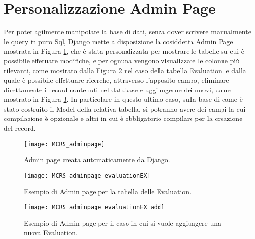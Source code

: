 \section*{Personalizzazione Admin Page}
Per poter agilmente manipolare la base di dati, senza dover scrivere manualmente le query in puro Sql, Django mette a disposizione 
la cosiddetta Admin Page mostrata in Figura \ref{fig:MCRS_adminpage}, che è stata personalizzata per mostrare le tabelle su cui è possibile 
effetuare modifiche, e per ognuna vengono visualizzate le colonne più rilevanti, come mostrato dalla 
Figura \ref{fig:MCRS_adminpage_evaluationEX} nel caso della tabella Evaluation, e dalla quale è possibile effettuare ricerche, attraverso 
l'apposito campo, eliminare direttamente i record contenuti nel database e aggiungerne dei nuovi, come mostrato in 
Figura \ref{fig:MCRS_adminpage_evaluationEX_add}.\hfill\break
In particolare in questo ultimo caso, sulla base di come è stato costruito il Model della relativa tabella, si potranno avere dei campi 
la cui compilazione è opzionale e altri in cui è obbligatorio compilare per la creazione del record.
%
\begin{figure}[ht!]
    \centering
    \texttt{[image: MCRS\_adminpage]}
    \caption[Admin page creata automaticamente da Django]{Admin page creata automaticamente da Django.}
    \label{fig:MCRS_adminpage}
\end{figure}
%
\begin{figure}[ht!]
    \centering
    \texttt{[image: MCRS\_adminpage\_evaluationEX]}
    \caption[Admin page per la tabella delle Evaluation]{Esempio di Admin page per la tabella delle Evaluation.}
    \label{fig:MCRS_adminpage_evaluationEX}
\end{figure}
%
\newpage
%
\begin{figure}[ht!]
    \centering
    \texttt{[image: MCRS\_adminpage\_evaluationEX\_add]}
    \caption[Admin page per aggiungere una nuova Evaluation]{Esempio di Admin page per il caso in cui si vuole aggiungere una nuova Evaluation.}
    \label{fig:MCRS_adminpage_evaluationEX_add}
\end{figure}
\hfill\break
%
\newpage
\break
%
